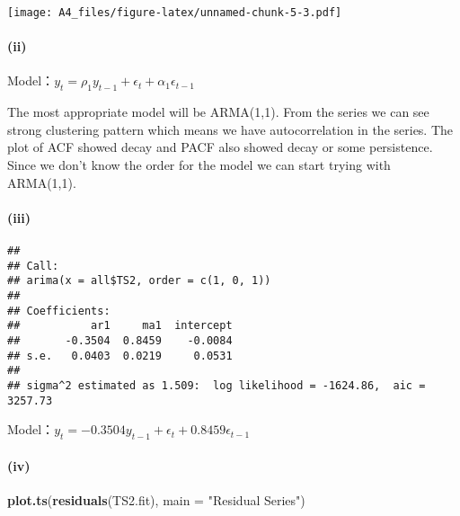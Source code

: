 \documentclass[]{article}
\newenvironment{Shaded}{\begin{snugshade}}{\end{snugshade}}
\newcommand{\DataTypeTok}[1]{\textcolor[rgb]{0.13,0.29,0.53}{#1}}
\newcommand{\DecValTok}[1]{\textcolor[rgb]{0.00,0.00,0.81}{#1}}
\newcommand{\KeywordTok}[1]{\textcolor[rgb]{0.13,0.29,0.53}{\textbf{#1}}}
\newcommand{\NormalTok}[1]{#1}
\newcommand{\OperatorTok}[1]{\textcolor[rgb]{0.81,0.36,0.00}{\textbf{#1}}}
\newcommand{\StringTok}[1]{\textcolor[rgb]{0.31,0.60,0.02}{#1}}
\let\oldparagraph\paragraph
\renewcommand{\paragraph}[1]{\oldparagraph{#1}\mbox{}}
\begin{document}
\texttt{[image: A4\_files/figure-latex/unnamed-chunk-5-3.pdf]}

\hypertarget{ii-1}{%
\paragraph{(ii)}\label{ii-1}}

Model：\(y_t = \rho_1y_{t-1} + \epsilon_t+ \alpha_1\epsilon_{t-1}\)

The most appropriate model will be ARMA(1,1). From the series we can see
strong clustering pattern which means we have autocorrelation in the
series. The plot of ACF showed decay and PACF also showed decay or some
persistence. Since we don't know the order for the model we can start
trying with ARMA(1,1).

\hypertarget{iii-1}{%
\paragraph{(iii)}\label{iii-1}}

\begin{Shaded}
\end{Shaded}

\begin{verbatim}
## 
## Call:
## arima(x = all$TS2, order = c(1, 0, 1))
## 
## Coefficients:
##           ar1     ma1  intercept
##       -0.3504  0.8459    -0.0084
## s.e.   0.0403  0.0219     0.0531
## 
## sigma^2 estimated as 1.509:  log likelihood = -1624.86,  aic = 3257.73
\end{verbatim}

Model：\(y_t = -0.3504y_{t-1} + \epsilon_t + 0.8459\epsilon_{t-1}\)

\hypertarget{iv-1}{%
\paragraph{(iv)}\label{iv-1}}

\begin{Shaded}
\begin{Highlighting}[]
\KeywordTok{plot.ts}\NormalTok{(}\KeywordTok{residuals}\NormalTok{(TS2.fit), }\DataTypeTok{main =} \StringTok{"Residual Series"}\NormalTok{)}
\end{Highlighting}
\end{Shaded}
\end{document}
